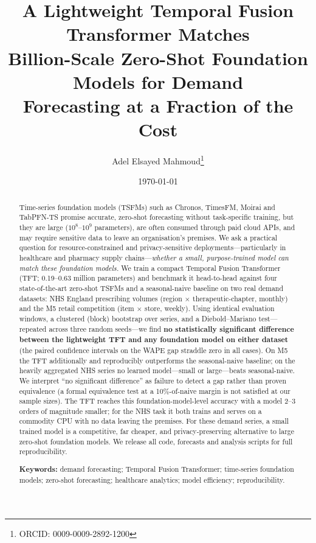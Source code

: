 \documentclass[11pt]{article}
\title{\textbf{A Lightweight Temporal Fusion Transformer Matches\\
Billion-Scale Zero-Shot Foundation Models for Demand\\
Forecasting at a Fraction of the Cost}}
\author[1]{Adel Elsayed Mahmoud\thanks{ORCID: 0009-0009-2892-1200}}
\affil[1]{Independent Researcher. Corresponding author: \texttt{adelelsayed1991@gmail.com}}
\date{\today}
\begin{document}
\maketitle

\begin{abstract}
\noindent
Time-series foundation models (TSFMs) such as Chronos, TimesFM, Moirai and TabPFN-TS
promise accurate, zero-shot forecasting without task-specific training, but they are
large ($10^8$--$10^9$ parameters), are often consumed through paid cloud APIs, and may
require sensitive data to leave an organisation's premises. We ask a practical question
for resource-constrained and privacy-sensitive deployments---particularly in healthcare
and pharmacy supply chains---\emph{whether a small, purpose-trained model can match these
foundation models.} We train a compact Temporal Fusion Transformer (TFT;
0.19--0.63 million parameters) and benchmark it head-to-head against four state-of-the-art
zero-shot TSFMs and a seasonal-naive baseline on two real demand datasets: NHS England
prescribing volumes (region $\times$ therapeutic-chapter, monthly) and the M5 retail
competition (item $\times$ store, weekly). Using identical evaluation windows, a clustered
(block) bootstrap over series, and a Diebold--Mariano test---repeated across three random
seeds---we find \textbf{no statistically significant difference between the lightweight TFT
and any foundation model on either dataset} (the paired confidence intervals on the WAPE
gap straddle zero in all cases). On M5 the TFT additionally and reproducibly outperforms the
seasonal-naive baseline; on the heavily aggregated NHS series no learned model---small or
large---beats seasonal-naive. We interpret ``no significant difference'' as failure to
detect a gap rather than proven equivalence (a formal equivalence test at a 10\%-of-naive
margin is not satisfied at our sample sizes). The TFT reaches this foundation-model-level
accuracy with a model 2--3 orders of magnitude smaller; for the NHS task it both trains and
serves on a commodity CPU with no data leaving the premises. For these demand series, a
small trained model is a competitive, far cheaper, and privacy-preserving alternative to
large zero-shot foundation models. We release all code, forecasts and analysis scripts for
full reproducibility.

\medskip
\noindent\textbf{Keywords:} demand forecasting; Temporal Fusion Transformer; time-series
foundation models; zero-shot forecasting; healthcare analytics; model efficiency;
reproducibility.
\end{abstract}
\end{document}
